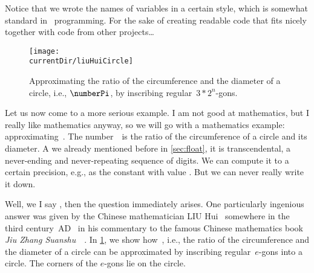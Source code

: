 Notice that we wrote the names of variables in a certain style, which is somewhat standard in \python\ programming.
For the sake of creating readable code that fits nicely together with code from other projects\dots%
%
%
\FloatBarrier%
\endhsection%
%
%
\label{sec:approximatePiLiuHui}%
%
\begin{figure}%
\centering%
\texttt{[image: \\currentDir/liuHuiCircle]}%
\caption{Approximating the ratio of the circumference and the diameter of a circle, i.e., $\numberPi$, by inscribing regular~$3*2^n$-gons.}%
\label{fig:liuHuiCircle}%
\end{figure}%
%
%
\def\liuhuir{\ensuremath{{\color{liuhui-r-color}r}}}%
%
\def\liuhuiss{\ensuremath{{\color{liuhui-s6-color}s_6}}}%
%
\def\liuhuist{\ensuremath{{\color{liuhui-s12-color}s_{12}}}}%
%
\def\liuhuiy{\ensuremath{{\color{liuhui-y-color}y}}}%
%
\def\liuhuix{\ensuremath{{\color{liuhui-x-color}x}}}%
%
\def\liuhuistf{\ensuremath{{\color{liuhui-s24-color}s_{24}}}}%
%
Let us now come to a more serious example.
I am not good at mathematics, but I really like mathematics anyway, so we will go with a mathematics example: approximating~\numberPi.
The number~\numberPi\ is the ratio of the circumference of a circle and its diameter.
A we already mentioned before in \cref{sec:float}, it is transcendental, a never-ending and never-repeating sequence of digits.
We can compute it to a certain precision, e.g., as the  constant  with value .
But we can never really write it down.

Well, we I say , then the question  immediately arises.
One particularly ingenious answer was given by the Chinese mathematician LIU Hui~ somewhere in the third century~AD~\cite{OR2003LH} in his commentary to the famous Chinese mathematics book \emph{Jiu Zhang Suanshu}~~\cite{OR2003LH,SCL1999TNCOTMACAC,S1998LHATFGAOCM,D2010AALHOCAS,C2002LFLHADWTDM}.
In \cref{fig:liuHuiCircle}, we show how~\numberPi, i.e., the ratio of the circumference and the diameter of a circle can be approximated by inscribing regular~$e$\nobreakdashes-gons into a circle.
The corners of the $e$\nobreakdashes-gons lie on the circle.

